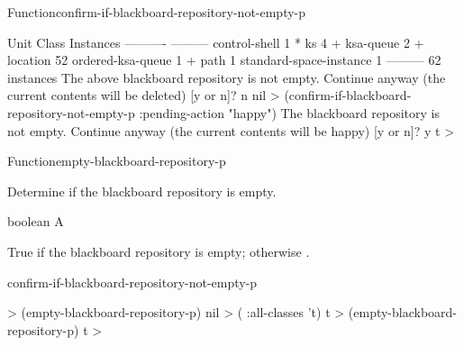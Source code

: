 \documentclass[10pt,twoside,english,pdftex]{article}
\begin{document}
\begin{functiondoc}{Function}{confirm-if-blackboard-repository-not-empty-p}{%
      
    \returns{} }
\begin{example}
  Unit Class                            Instances
  ----------                            ---------
  control-shell                                 1 *
  ks                                            4 +
  ksa-queue                                     2 +
  location                                     52  
  ordered-ksa-queue                             1 +
  path                                          1  
  standard-space-instance                       1  
                                        ---------
                                               62 instances
  The above blackboard repository is not empty.
  Continue anyway (the current contents will be deleted) [y or n]? n
  nil
  > (confirm-if-blackboard-repository-not-empty-p :pending-action "happy")
  The blackboard repository is not empty.
  Continue anyway (the current contents will be happy) [y or n]? y
  t
  >
\end{example}

\end{functiondoc}


\begin{functiondoc}{Function}{empty-blackboard-repository-p}{%
    \returns{} }
%

\fnsyntax 

\fnpurpose Determine if the blackboard repository is empty.

\fnpackage {}

\fnmodule {}

\fnargs
\begin{args}{boolean}
\arg[boolean] A 
\end{args}

\fnreturns True if the blackboard repository is empty; otherwise \nil.

\begin{alsos}{confirm-if-blackboard-repository-not-empty-p}
\end{alsos}

\fnexamples 
%
%
%
\W\supp
\begin{example}
  > (empty-blackboard-repository-p)
  nil
  > ( :all-classes 't)
  t
  > (empty-blackboard-repository-p)
  t
  >
\end{example}

\end{functiondoc}
\end{document}
